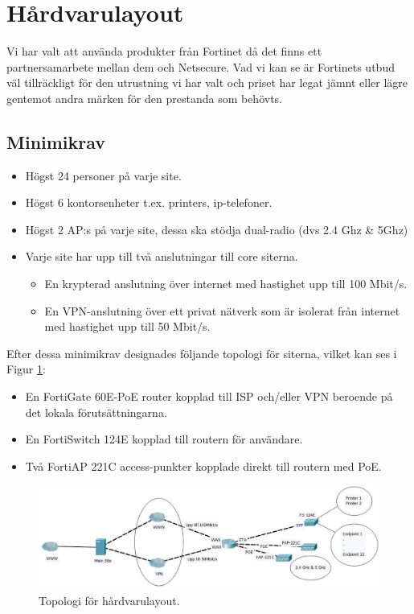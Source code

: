 \section{Hårdvarulayout}
    Vi har valt att använda produkter från Fortinet då det finns ett partnersamarbete mellan dem och Netsecure. Vad vi kan se är Fortinets utbud väl tillräckligt för den utrustning vi har valt och priset har legat jämnt eller lägre gentemot andra märken för den prestanda som behövts.

\subsection{Minimikrav}
    \begin{itemize}[noitemsep]
        \item Högst 24 personer på varje site.
        \item Högst 6 kontorsenheter t.ex. printers, ip-telefoner.
        \item Högst 2 AP:s på varje site, dessa ska stödja dual-radio (dvs 2.4 Ghz \& 5Ghz)
        \item Varje site har upp till två anslutningar till core siterna.
        \begin{itemize}[noitemsep]
        	\item En krypterad anslutning över internet med hastighet upp till 100 Mbit/s.
            \item En VPN-anslutning över ett privat nätverk som är isolerat från internet med hastighet upp till 50 Mbit/s.
        \end{itemize}
    \end{itemize}
    
    \noindent Efter dessa minimikrav designades följande topologi för siterna, vilket kan ses i Figur \ref{fig:site-topology}:
    \begin{itemize}[noitemsep]
    	\item En FortiGate 60E-PoE router kopplad till ISP och/eller VPN beroende på det lokala förutsättningarna.
        \item En FortiSwitch 124E kopplad till routern för användare.
        \item Två FortiAP 221C access-punkter kopplade direkt till routern med PoE.
    \end{itemize}
    
 	\begin{figure}[htb]
        \centering
        \includegraphics[width=\textwidth]{pics/Topologi_H_rdvara.pdf}
        \caption{Topologi för hårdvarulayout.}
        \label{fig:site-topology}
    \end{figure}

